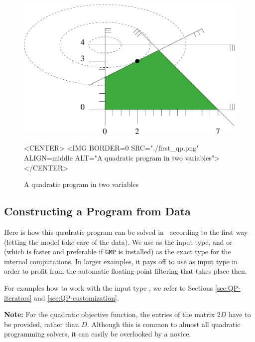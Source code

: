 \begin{figure}[htbp]
\begin{ccTexOnly}
\begin{center}
\includegraphics{QP_solver/first_qp} %
\end{center}
\end{ccTexOnly}

\begin{ccHtmlOnly}
<CENTER>
<IMG BORDER=0 SRC="./first_qp.png" ALIGN=middle ALT="A quadratic program in two variables">
</CENTER>
\end{ccHtmlOnly}

\caption{A quadratic program in two variables
\label{fig:QP-first_qp}}
\end{figure}

\subsection{Constructing a Program from Data}
Here is how this quadratic program can be solved in \cgal\ 
according to the first way (letting the model take care of
the data). We use  as the input type, and 
 or  (which is faster and preferable if
\texttt{GMP} is installed) as the exact type for the
internal computations. In larger examples, it pays off to use
 as input type in order to profit from the 
automatic floating-point filtering that takes place then.

For examples 
how to work with the input type , we refer to 
Sections \ref{sec:QP-iterators} and \ref{sec:QP-customization}.

{\bf Note:} For the quadratic objective function, the entries 
of the matrix $2D$ have to be provided, rather than $D$. Although 
this is common to almost all quadratic programming solvers, it 
can easily be overlooked by a novice.

